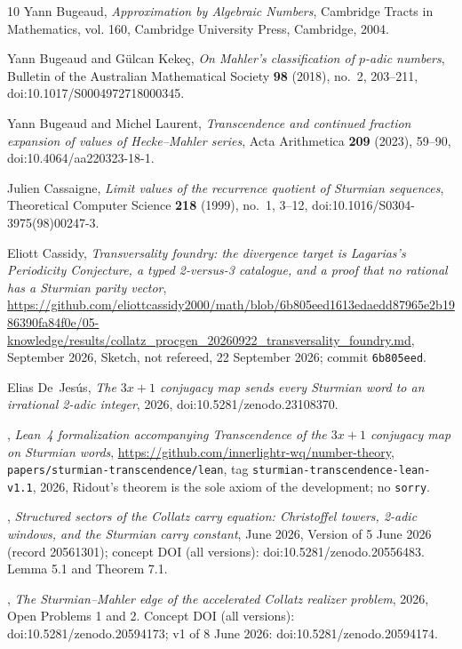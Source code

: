 \documentclass[11pt,reqno]{amsart}
\theoremstyle{plain}
\theoremstyle{definition}
\begin{document}
\begin{thebibliography}{10}
Yann Bugeaud, \emph{Approximation by {A}lgebraic {N}umbers}, Cambridge Tracts
  in Mathematics, vol. 160, Cambridge University Press, Cambridge, 2004.

Yann Bugeaud and G\"ulcan Keke\c{c}, \emph{On {M}ahler's classification of
  $p$-adic numbers}, Bulletin of the Australian Mathematical Society
  \textbf{98} (2018), no.~2, 203--211, doi:10.1017/S0004972718000345.

Yann Bugeaud and Michel Laurent, \emph{Transcendence and continued fraction
  expansion of values of {H}ecke--{M}ahler series}, Acta Arithmetica
  \textbf{209} (2023), 59--90, doi:10.4064/aa220323-18-1.

Julien Cassaigne, \emph{Limit values of the recurrence quotient of {S}turmian
  sequences}, Theoretical Computer Science \textbf{218} (1999), no.~1, 3--12,
  doi:10.1016/S0304-3975(98)00247-3.

Eliott Cassidy, \emph{Transversality foundry: the divergence target is
  {L}agarias's {P}eriodicity {C}onjecture, a typed 2-versus-3 catalogue, and a
  proof that no rational has a {S}turmian parity vector},
  \url{https://github.com/eliottcassidy2000/math/blob/6b805eed1613edaedd87965e2b1986390fa84f0e/05-knowledge/results/collatz_procgen_20260922_transversality_foundry.md},
  September 2026, Sketch, not refereed, 22 September 2026; commit
  \texttt{6b805eed}.

Elias De~Jes\'us, \emph{The $3x+1$ conjugacy map sends every {S}turmian word to
  an irrational 2-adic integer}, 2026, doi:10.5281/zenodo.23108370.

\bysame, \emph{Lean~4 formalization accompanying \emph{Transcendence of the
  $3x+1$ conjugacy map on Sturmian words}},
  \url{https://github.com/innerlightr-wq/number-theory},
  \texttt{papers/sturmian-transcendence/lean}, tag
  \texttt{sturmian-transcendence-lean-v1.1}, 2026, Ridout's theorem is the sole
  axiom of the development; no \texttt{sorry}.

\bysame, \emph{Structured sectors of the {C}ollatz carry equation:
  {C}hristoffel towers, 2-adic windows, and the {S}turmian carry constant},
  June 2026, Version of 5 June 2026 (record 20561301); concept DOI (all
  versions): doi:10.5281/zenodo.20556483. Lemma 5.1 and Theorem 7.1.

\bysame, \emph{The {S}turmian--{M}ahler edge of the accelerated {C}ollatz
  realizer problem}, 2026, Open Problems 1 and 2. Concept DOI (all versions):
  doi:10.5281/zenodo.20594173; v1 of 8 June 2026: doi:10.5281/zenodo.20594174.


\end{thebibliography}
\end{document}
